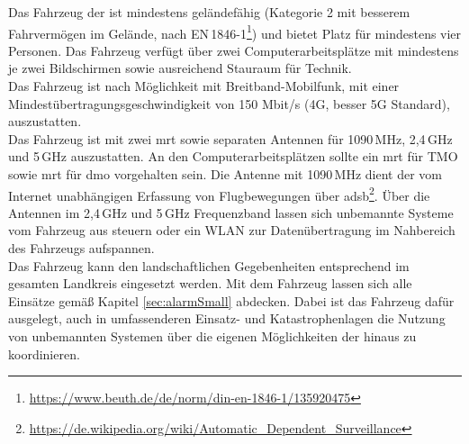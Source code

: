 Das Fahrzeug der \callee{} ist mindestens geländefähig (Kategorie 2 mit besserem Fahrvermögen im Gelände, nach EN\,1846-1\footnote{\url{https://www.beuth.de/de/norm/din-en-1846-1/135920475}}) und bietet Platz für mindestens vier Personen. Das Fahrzeug verfügt über zwei Computerarbeitsplätze mit mindestens je zwei Bildschirmen sowie ausreichend Stauraum für Technik.\\

\noindent Das Fahrzeug ist nach Möglichkeit mit Breitband-Mobilfunk, mit einer Mindestübertragungsgeschwindigkeit von 150 Mbit/s (4G, besser 5G Standard), auszustatten.\\

\noindent Das Fahrzeug ist mit zwei \ac{mrt} sowie separaten Antennen für 1090\,MHz, 2,4\,GHz und 5\,GHz auszustatten. An den Computerarbeitsplätzen sollte ein \ac{mrt} für TMO sowie \ac{mrt} für \ac{dmo} vorgehalten sein. Die Antenne mit 1090\,MHz dient der vom Internet unabhängigen Erfassung von Flugbewegungen über \acs{adsb}\footnote{\url{https://de.wikipedia.org/wiki/Automatic_Dependent_Surveillance}}. Über die Antennen im 2,4\,GHz und 5\,GHz Frequenzband lassen sich unbemannte Systeme vom Fahrzeug aus steuern oder ein WLAN zur Datenübertragung im Nahbereich des Fahrzeugs aufspannen.\\

\noindent Das Fahrzeug kann den landschaftlichen Gegebenheiten entsprechend im gesamten Landkreis \district{} eingesetzt werden. Mit dem Fahrzeug lassen sich alle Einsätze gemäß Kapitel \ref{sec:alarmSmall} abdecken. Dabei ist das Fahrzeug dafür ausgelegt, auch in umfassenderen Einsatz- und Katastrophenlagen die Nutzung von unbemannten Systemen über die eigenen Möglichkeiten der \callee{} hinaus zu koordinieren.
